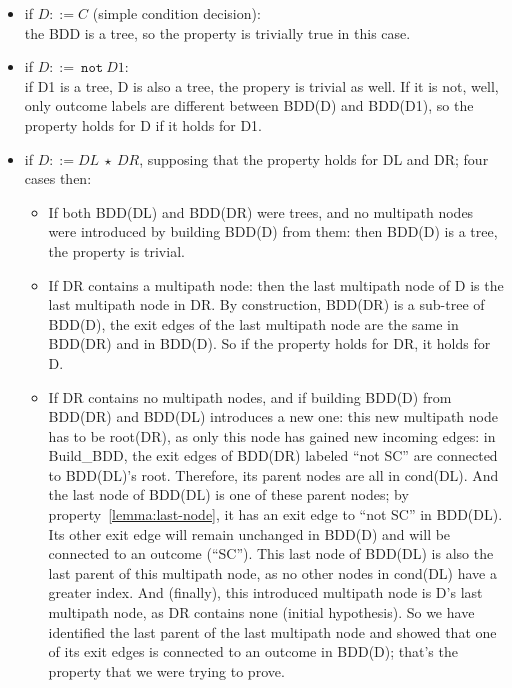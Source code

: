 \documentclass[a4paper,12pt,twoside]{article}
\newcommand{\anysc}{\star}
\newcommand{\adanot}{\texttt{not}}
\begin{document}
\begin{itemize}
\item if $D ::= C$ (simple condition decision):\\
  the BDD is a tree, so the property is trivially true in this case.

\item if $D ::=\ \adanot{} \ D1$:\\
  if D1 is a tree, D is also a tree, the propery is trivial
  as well. If it is not, well, only outcome labels are different
  between BDD(D) and BDD(D1), so the property holds for D if it holds for D1.

\item if $D ::= DL \ \anysc{} \ DR$, supposing that the property holds
  for DL and DR; four cases then:

  \begin{itemize}
  \item If both BDD(DL) and BDD(DR) were trees, and no multipath nodes were
    introduced by building BDD(D) from them: then BDD(D) is a tree,
    the property is trivial.

  \item If DR contains a multipath node: then the last multipath node of D
    is the last multipath node in DR. By construction, BDD(DR) is a
    sub-tree of BDD(D), the exit edges of the last multipath node are
    the same in BDD(DR) and in BDD(D). So if the property holds for
    DR, it holds for D.

  \item If DR contains no multipath nodes, and if building BDD(D) from
    BDD(DR) and BDD(DL) introduces a new one: this new multipath
    node has to be root(DR), as only this node has gained new incoming
    edges: in Build\_BDD, the exit edges of BDD(DR) labeled ``not SC''
    are connected to BDD(DL)'s root. Therefore, its parent nodes are
    all in cond(DL). And the last node of BDD(DL) is one of these
    parent nodes; by property~\ref{lemma:last-node}, it has an exit
    edge to ``not SC'' in BDD(DL). Its other exit edge will remain
    unchanged in BDD(D) and will be connected to an outcome
    (``SC''). This last node of BDD(DL) is also the last parent of
    this multipath node, as no other nodes in cond(DL) have a greater
    index. And (finally), this introduced multipath node is D's last
    multipath node, as DR contains none (initial hypothesis). So
    we have identified the last parent of the last multipath node and showed
    that one of its exit edges is connected to an outcome in BDD(D); that's
    the property that we were trying to prove.


\end{itemize}
\end{itemize}
\end{document}
